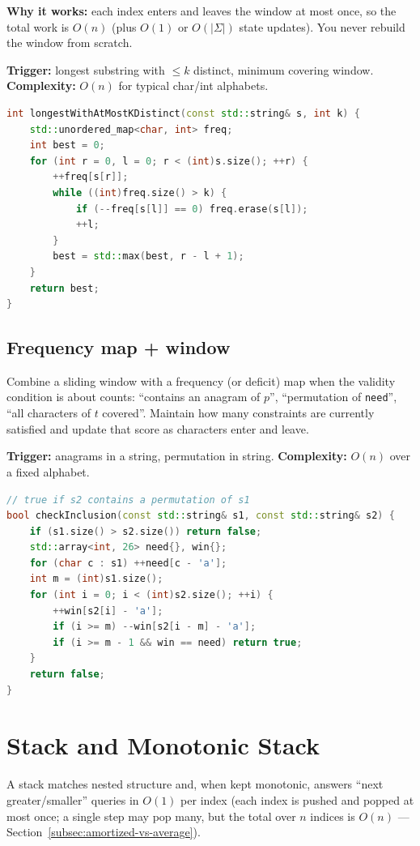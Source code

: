 \par\noindent\textbf{Why it works:} each index enters and leaves the window at
most once, so the total work is $O(n)$ (plus $O(1)$ or $O(|\Sigma|)$ state
updates). You never rebuild the window from scratch.

\textbf{Trigger:} longest substring with $\le k$ distinct, minimum covering window.
\newline
\textbf{Complexity:} $O(n)$ for typical char/int alphabets.

\begin{lstlisting}[language=C++]
int longestWithAtMostKDistinct(const std::string& s, int k) {
    std::unordered_map<char, int> freq;
    int best = 0;
    for (int r = 0, l = 0; r < (int)s.size(); ++r) {
        ++freq[s[r]];
        while ((int)freq.size() > k) {
            if (--freq[s[l]] == 0) freq.erase(s[l]);
            ++l;
        }
        best = std::max(best, r - l + 1);
    }
    return best;
}
\end{lstlisting}

\subsection{Frequency map + window}
\label{subsec:pat-freq-window}
Combine a sliding window with a frequency (or deficit) map when the validity
condition is about counts: ``contains an anagram of $p$'', ``permutation of
\texttt{need}'', ``all characters of $t$ covered''. Maintain how many constraints
are currently satisfied and update that score as characters enter and leave.

\textbf{Trigger:} anagrams in a string, permutation in string.
\newline
\textbf{Complexity:} $O(n)$ over a fixed alphabet.

\begin{lstlisting}[language=C++]
// true if s2 contains a permutation of s1
bool checkInclusion(const std::string& s1, const std::string& s2) {
    if (s1.size() > s2.size()) return false;
    std::array<int, 26> need{}, win{};
    for (char c : s1) ++need[c - 'a'];
    int m = (int)s1.size();
    for (int i = 0; i < (int)s2.size(); ++i) {
        ++win[s2[i] - 'a'];
        if (i >= m) --win[s2[i - m] - 'a'];
        if (i >= m - 1 && win == need) return true;
    }
    return false;
}
\end{lstlisting}

\section{Stack and Monotonic Stack}
\label{sec:pat-stack}
A stack matches nested structure and, when kept monotonic, answers ``next
greater/smaller'' queries in  $O(1)$ per index
(each index is pushed and popped at most once; a single step may pop many,
but the total over $n$ indices is $O(n)$ --- Section~\ref{subsec:amortized-vs-average}).

